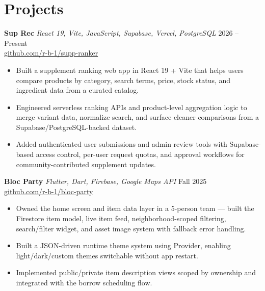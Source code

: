 \documentclass[letterpaper,10.5pt]{article}
\begin{document}
\section{Projects}

\textbf{Sup Rec} \hfill
\textit{React 19, Vite, JavaScript, Supabase, Vercel, PostgreSQL} \hfill 2026 -- Present \\
\href{https://github.com/r-b-1/supp-ranker}{github.com/r-b-1/supp-ranker}
\begin{itemize}[leftmargin=1.5em, itemsep=1pt, topsep=3pt]
  \item Built a supplement ranking web app in React 19 + Vite that
        helps users compare products by category, search terms, price,
        stock status, and ingredient data from a curated catalog.
  \item Engineered serverless ranking APIs and product-level
        aggregation logic to merge variant data, normalize search, and
        surface cleaner comparisons from a Supabase/PostgreSQL-backed
        dataset.
  \item Added authenticated user submissions and admin review tools
        with Supabase-based access control, per-user request quotas,
        and approval workflows for community-contributed supplement
        updates.
\end{itemize}

\vspace{4pt}

\textbf{Bloc Party} \hfill
\textit{Flutter, Dart, Firebase, Google Maps API} \hfill Fall 2025 \\
\href{https://github.com/r-b-1/bloc-party}{github.com/r-b-1/bloc-party}
\begin{itemize}[leftmargin=1.5em, itemsep=1pt, topsep=3pt]
  \item Owned the home screen and item data layer in a 5-person team
        — built the Firestore item model, live item feed,
        neighborhood-scoped filtering, search/filter widget, and
        asset image system with fallback error handling.
  \item Built a JSON-driven runtime theme system using Provider,
        enabling light/dark/custom themes switchable without app
        restart.
  \item Implemented public/private item description views scoped by
        ownership and integrated with the borrow scheduling flow.
\end{itemize}
\end{document}

